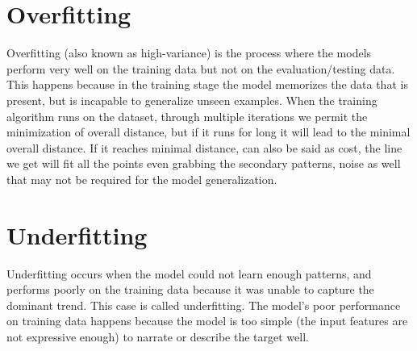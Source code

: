\section{Overfitting}
    Overfitting (also known as high-variance) is the process where the models perform very well on the training data but not on the evaluation/testing data. This happens because in the training stage the model memorizes the data that is present, but is incapable to generalize unseen examples. When the training algorithm runs on the dataset, through multiple iterations we permit the minimization of overall distance, but if it runs for long it will lead to the minimal overall distance. If it reaches minimal distance, can also be said as cost, the line we get will fit all the points even grabbing the secondary patterns, noise as well that may not be required for the model generalization.

\section{Underfitting}
    Underfitting occurs when the model could not learn enough patterns, and performs poorly on the training data because it was unable to capture the dominant trend. This case is called underfitting. The model’s poor performance on training data happens because the model is too simple (the input features are not expressive enough) to narrate or describe the target well.


